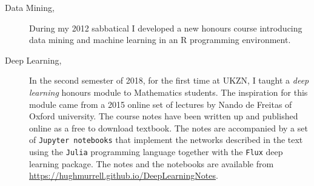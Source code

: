 \begin{description}
\begin{description}
 \item[Data Mining,] During my 2012 sabbatical I developed a new honours 
      course introducing data mining and machine learning in an R programming
      environment. 
  \item[Deep Learning,] In the second semester of 2018,  for the first time at UKZN, 
  I taught  a {\it deep learning} honours module to Mathematics students. The inspiration
  for this module came from a 2015 online set of lectures by Nando de Freitas of Oxford university.
  The course notes have been written up and published online as a free to download textbook.
  The notes are accompanied by a set of {\tt Jupyter notebooks} that implement the networks described in the
  text using the {\tt Julia} programming language together with the {\tt Flux} deep learning package.
  The notes and the notebooks are available from \url{https://hughmurrell.github.io/DeepLearningNotes}.
   
\end{description}

\end{description}
\label{f0}
